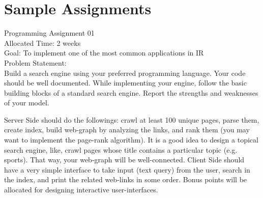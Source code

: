 \documentclass{article}
\begin{document}


\appendix
\section{Sample Assignments}
\label{appA}
\begin{mdframed}[style=MyFrame]
\small
\label{Problem1}
Programming Assignment 01\\
Allocated Time: 2 weeks\\
Goal: To implement one of the most common applications in IR\\
Problem Statement:\\
Build a search engine using your preferred programming language. Your code should be well documented. While implementing your engine, follow the basic building blocks of a standard search engine. Report the strengths and weaknesses of your model.  
\par Server Side should do the followings: crawl at least 100 unique pages, parse them, create index, build web-graph by analyzing the links, and rank them (you may want to implement the page-rank algorithm). It is a good idea to design a topical search engine, like, crawl pages whose title contains a particular topic (e.g. sports). That way, your web-graph will be well-connected. Client Side should have a very simple interface to take input (text query) from the user, search in the index, and print the related web-links in some order. Bonus points will be allocated for designing interactive user-interfaces.  
\end{mdframed}
\end{document}
